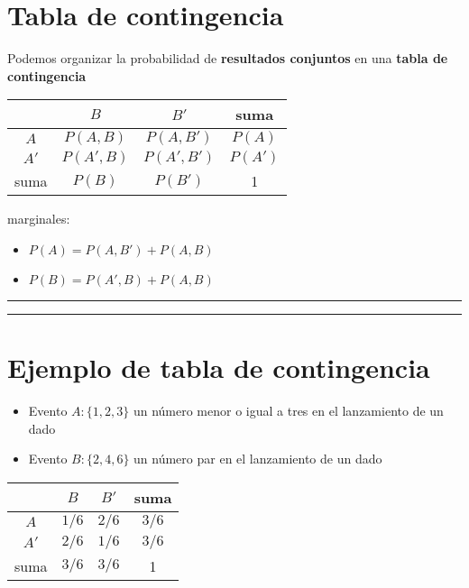 \documentclass[
]{book}
\providecommand{\tightlist}{%
  \setlength{\itemsep}{0pt}\setlength{\parskip}{0pt}}
\begin{document}
\hypertarget{tabla-de-contingencia}{%
\section{Tabla de contingencia}\label{tabla-de-contingencia}}

Podemos organizar la probabilidad de \textbf{resultados conjuntos} en una \textbf{tabla de contingencia}

\begin{longtable}[]{@{}cccc@{}}
\toprule
& \(B\) & \(B'\) & suma \\
\midrule
\endhead
\(A\) & \(P(A, B )\) & \(P(A, B' )\) & \(P(A)\) \\
\(A'\) & \(P(A', B )\) & \(P(A', B' )\) & \(P(A')\) \\
suma & \(P(B)\) & \(P(B')\) & 1 \\
\bottomrule
\end{longtable}

marginales:

\begin{itemize}
\tightlist
\item
  \(P(A)=P(A, B') + P(A, B)\)
\item
  \(P(B)=P(A', B) +P(A, B)\)
\end{itemize}

\begin{center}\rule{0.5\linewidth}{0.5pt}\end{center}

\begin{center}\rule{0.5\linewidth}{0.5pt}\end{center}

\hypertarget{ejemplo-de-tabla-de-contingencia}{%
\section{Ejemplo de tabla de contingencia}\label{ejemplo-de-tabla-de-contingencia}}

\begin{itemize}
\tightlist
\item
  Evento \(A:\{1,2,3\}\) un número menor o igual a tres en el lanzamiento de un dado
\item
  Evento \(B:\{2,4,6\}\) un número par en el lanzamiento de un dado
\end{itemize}

\begin{longtable}[]{@{}cccc@{}}
\toprule
& \(B\) & \(B'\) & suma \\
\midrule
\endhead
\(A\) & \(1/6\) & \(2/6\) & \(3/6\) \\
\(A'\) & \(2/6\) & \(1/6\) & \(3/6\) \\
suma & \(3/6\) & \(3/6\) & 1 \\
\bottomrule
\end{longtable}
\end{document}
